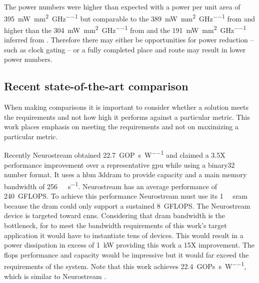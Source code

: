 The power numbers were higher than expected %
with a power per unit area of \SI[per-mode=symbol]{395}{\milli\watt\per\square\milli\meter\per\giga\hertz} but comparable to the \SI[per-mode=symbol]{389}{\milli\watt\per\square\milli\meter\per\giga\hertz} from \cite{chen2016diannao} and higher than the \SI[per-mode=symbol]{304}{\milli\watt\per\square\milli\meter\per\giga\hertz} from \cite{azarkhish2017neurostream} and the \SI[per-mode=symbol]{191}{\milli\watt\per\square\milli\meter\per\giga\hertz} inferred from \cite{jouppi2017datacenter}.
Therefore there may either be opportunities for power reduction -- such as clock gating -- or a fully completed place and route may result in lower power numbers.

\subsection{Recent state-of-the-art comparison}
\label{sec:State-of-the-art Comparison}
When making comparisons it is important to consider whether a solution meets the requirements and not how high it performs against a particular metric.
This work places emphasis on meeting the requirements and not on maximizing a particular metric.

Recently Neurostream \cite{azarkhish2017neurostream} obtained \SI[per-mode=symbol]{22.7}{\giga OP\per\second\per\watt} and claimed a 3.5X performance improvement over a representative \ac{gpu} while using a \ac{binary32} number format.
It uses a \ac{hbm} \ac{3ddram} to provide capacity and a main memory bandwidth of \SI[per-mode=symbol]{256}{\giga\bit\per\second}. Neurostream has an average performance of \SI[per-mode=symbol]{240}{\giga FLOPS}.
To achieve this performance Neurostream must use its \SI[per-mode=symbol]{1}{\mega\bit} \ac{sram} because the \ac{dram} could only support a sustained \SI[per-mode=symbol]{8}{\giga FLOPS}.
The Neurostream device is targeted toward \acp{cnn}.
Considering that \ac{dram} bandwidth is the bottleneck, for \cite{azarkhish2017neurostream} to meet the bandwidth requirements of this work's target application it would have to instantiate tens of devices.
This would result in a power dissipation in excess of \SI[per-mode=symbol]{1}{\kilo\watt} providing this work a 15X improvement.
The \acp{flop} performance and capacity would be impressive but it would far exceed the requirements of the system.
Note that this work achieves \SI[per-mode=symbol]{22.4}{\giga OPs\per\second\per\watt}, which is similar to Neurostream \cite{azarkhish2017neurostream}.

